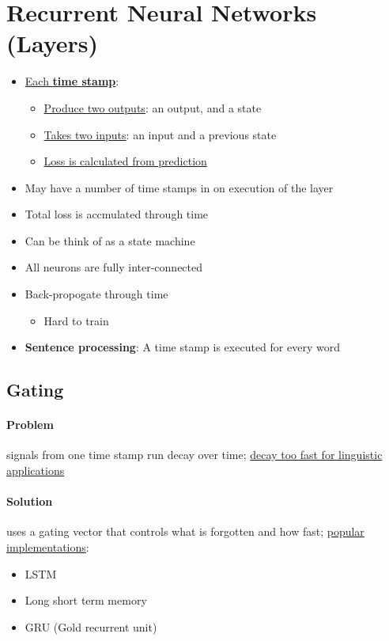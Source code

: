 \section{Recurrent Neural Networks (Layers)}

  \begin{itemize}
    \item \ul{Each \textbf{time stamp}}:
    \begin{itemize}
      \item \ul{Produce two outputs}: an output, and a state
      \item \ul{Takes two inputs}: an input and a previous state
      \item \ul{Loss is calculated from prediction}
    \end{itemize}

    \item May have a number of time stamps in on execution of the layer
    \item Total loss is accmulated through time
    \item Can be think of as a state machine
    \item All neurons are fully inter-connected
    \item Back-propogate through time
    \begin{itemize}
      \item Hard to train
    \end{itemize}

    \item \textbf{Sentence processing}: A time stamp is executed
    for every word
  \end{itemize}

  \subsection{Gating}

    \paragraph{Problem} signals from one time stamp run decay over time;
    \ul{decay too fast for linguistic applications}

    \paragraph{Solution} uses a gating vector that controls what is
    forgotten and how fast; \ul{popular implementations}:
    \begin{itemize}
      \item LSTM
      \item Long short term memory
      \item GRU (Gold recurrent unit)
    \end{itemize}

